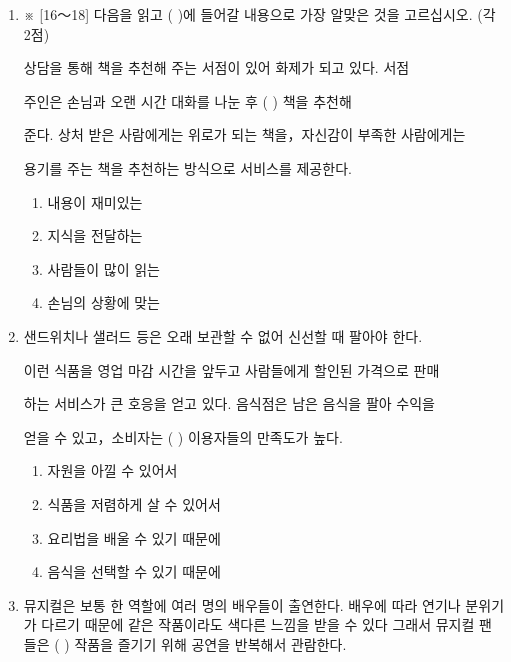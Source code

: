 \documentclass[12pt]{article}
\begin{document}
\begin{enumerate}[1.]
    \item ※ [16～18] 다음을 읽고 (   )에 들어갈 내용으로 가장 알맞은 것을 고르십시오. (각 2점)


    \begin{mdframed}
    상담을 통해 책을 추천해 주는 서점이 있어 화제가 되고 있다. 서점

    주인은 손님과 오랜 시간 대화를 나눈 후 (     ) 책을 추천해

    준다. 상처 받은 사람에게는 위로가 되는 책을，자신감이 부족한 사람에게는

    용기를 주는 책을 추천하는 방식으로 서비스를 제공한다.
    \end{mdframed}

    \begin{enumerate}[1)]
        \item 내용이 재미있는
        \item 지식을 전달하는
        \item 사람들이 많이 읽는
        \item 손님의 상황에 맞는
    \end{enumerate}


    \item

    \begin{mdframed}
    샌드위치나 샐러드 등은 오래 보관할 수 없어 신선할 때 팔아야 한다.

    이런 식품을 영업 마감 시간을 앞두고 사람들에게 할인된 가격으로 판매

    하는 서비스가 큰 호응을 얻고 있다. 음식점은 남은 음식을 팔아 수익을

    얻을 수 있고，소비자는 (     ) 이용자들의 만족도가 높다.

    \end{mdframed}

    \begin{enumerate}[1)]
        \item 자원을 아낄 수 있어서
        \item 식품을 저렴하게 살 수 있어서
        \item 요리법을 배울 수 있기 때문에
        \item 음식을 선택할 수 있기 때문에
    \end{enumerate}


    \item

    \begin{mdframed}
    뮤지컬은 보통 한 역할에 여러 명의 배우들이 출연한다. 배우에 따라
    연기나 분위기가 다르기 때문에 같은 작품이라도 색다른 느낌을 받을 수
    있다 그래서 뮤지컬 팬들은 (      ) 작품을 즐기기 위해 공연을
    반복해서 관람한다.
    \end{mdframed}


\end{enumerate}
\end{document}
